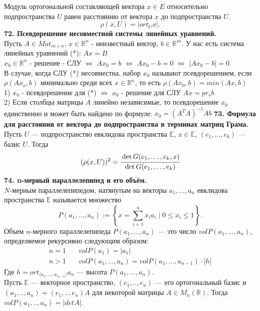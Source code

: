 \documentclass{article}
\begin{document}
Модуль ортогональной составляющей вектора $x \in E$ относительно подпространства $U$ равен расстоянию от вектора $x$ до подпространства $U$.
$$
\rho (x,U) = |ort_U x|.
$$
\newline
\newline
\textbf{72. Псевдорешение несовместной системы линейных уравнений.}\\
Пусть $A\in Mat_{m\times n}$, $x\in \mathbb{R}^n$ - неизвестный вектор, $b \in \mathbb{R}^m$. У нас есть система линейных уравнений (*): $Ax=B$\\ 
$x_0 \in \mathbb{R}^n$ - решение - СЛУ $\Leftrightarrow$ $Ax_0=b$ $\Leftrightarrow$ $Ax_0-b=0$  $\Leftrightarrow$ $|Ax_0-b|=0$.\\ 
В случае, когда СЛУ (*) несовместна, набор $x_0$ называют псевдорешением, если $\rho(Ax_o,b)$ минимально среди всех $x \in \mathbb{R}^n$, то есть $\rho(Ax_0, b)=min(Ax,b)$\\
1) $x_0$ - псевдорешение для (*) $\Leftrightarrow$ $x_0$ - решение для СЛУ $Ax=pr_sb$\\
2) Если столбцы матрицы $A$ линейно независимые, то псевдорешение $x_0$ единственно и может быть найдено по формуле: $x_0=(A^TA)^{-1}Ab$
\newpage
\textbf{73. Формула для расстояния от вектора до подпространства в терминах матриц Грама.}\\
Пусть $U$ --- подпространство евклидова пространства $\mathbb{E}$, $x \in \mathbb{E}$, $(e_1, \ldots, e_k)$ --- базис $U$. Тогда 
$$(\rho(x,U))^2 = \cfrac{\det G(e_1, \ldots, e_k, x)}{\det G(e_1, \ldots, e_k)}$$
\textbf{74. n-мерный параллелепипед и его объём.}\\
$N$-мерным параллелепипедом, натянутым на векторы $a_1, \ldots, a_n$ евклидова пространства $\mathbb{E}$ называется множество 
$$
P(a_1, \ldots, a_n) := \left\{ x = \sum_{i = 1}^n x_ia_i \mid 0 \leqslant x_i \leqslant 1 \right\}.
$$  
Объем $n$-мерного параллелепипеда $P(a_1, \ldots, a_{n})$ --- это число $vol P(a_1, \ldots, a_{n})$, определяемое рекурсивно следующим образом:
\begin{align*}
n = 1 \quad& vol P(a_1) = |a_1| \\
n > 1 \quad& vol P(a_1, \ldots, a_n) = vol P(a_1, \ldots, a_{n-1})\cdot |h|
\end{align*}
Где $h = ort_{\langle a_1, \ldots, a_{n-1}\rangle}a_n$ --- высота $P(a_1, \ldots, a_n)$.\\
Пусть $\mathbb{E}$ --- векторное пространство, $(e_1,..,e_n)$ --- его ортогональный базис и $(a_1,..,a_n) = (e_1,..,e_n)A$ для некоторой матрицы $A \in M_n(\mathbb{R})$. Тогда $vol P(a_1,..,a_n) = |det A|$.
\end{document}
